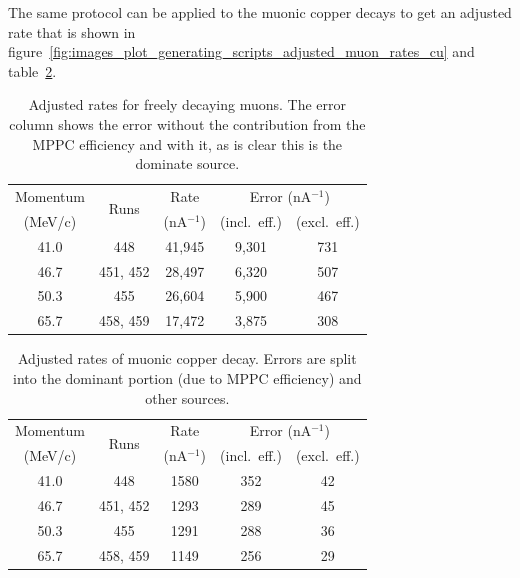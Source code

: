 The same protocol can be applied to the muonic copper decays to get an adjusted rate that is shown in figure~\ref{fig:images_plot_generating_scripts_adjusted_muon_rates_cu} and table~\ref{tab:adjusted_cu_rates}.

\begin{table}
  \begin{center}
  \begin{tabular}{c | c | c | c | c}
    Momentum  & \multirow{2}{*}{Runs}  &  Rate           &  \multicolumn{2}{c}{Error (nA\(^{-1}\))} \\
     (MeV/c)  &                        &  (nA\(^{-1}\))  &     (incl.\ eff.)  &  (excl.\ eff.)      \\
    \hline
    41.0  &       448  &  41,945  &  9,301  &  731  \\
    46.7  &  451, 452  &  28,497  &  6,320  &  507  \\
    50.3  &       455  &  26,604  &  5,900  &  467  \\
    65.7  &  458, 459  &  17,472  &  3,875  &  308  \\
  \end{tabular}
  \end{center}
  \caption{Adjusted rates for freely decaying muons. The error column shows the error without the contribution from the MPPC efficiency and with it, as is clear this is the dominate source.}
  \label{tab:adjusted_free_decay_rates}
\end{table}

\begin{table}
  \begin{center}
  \begin{tabular}{c | c | c | c | c}
    Momentum  & \multirow{2}{*}{Runs}  &  Rate           &  \multicolumn{2}{c}{Error (nA\(^{-1}\))} \\
     (MeV/c)  &                        &  (nA\(^{-1}\))  &     (incl.\ eff.)  &  (excl.\ eff.)      \\
    \hline
    41.0  &       448  &  1580  &  352  &  42  \\
    46.7  &  451, 452  &  1293  &  289  &  45  \\
    50.3  &       455  &  1291  &  288  &  36  \\
    65.7  &  458, 459  &  1149  &  256  &  29  \\
  \end{tabular}
  \end{center}
  \caption{Adjusted rates of muonic copper decay. Errors are split into the dominant portion (due to MPPC efficiency) and other sources.}
  \label{tab:adjusted_cu_rates}
\end{table}

